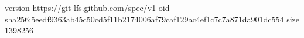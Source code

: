 version https://git-lfs.github.com/spec/v1
oid sha256:5eedf9363ab45c50cd5f11b2174006af79caf129ac4ef1c7c7a871da901dc554
size 1398256
